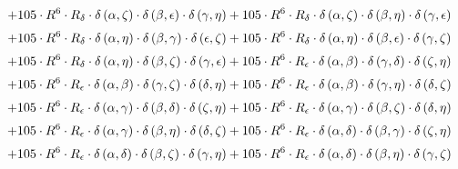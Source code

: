 \begin{subequations}
\begin{gather}
 \\[0.2em] \notag 		 + 105 \cdot R^{6} \cdot R_{\delta{}} \cdot \delta{}\left(\alpha{}, \zeta{}\right) \cdot \delta{}\left(\beta{}, \epsilon{}\right) \cdot \delta{}\left(\gamma{}, \eta{}\right)+ 105 \cdot R^{6} \cdot R_{\delta{}} \cdot \delta{}\left(\alpha{}, \zeta{}\right) \cdot \delta{}\left(\beta{}, \eta{}\right) \cdot \delta{}\left(\gamma{}, \epsilon{}\right) 
 \\[0.2em] \notag 		 + 105 \cdot R^{6} \cdot R_{\delta{}} \cdot \delta{}\left(\alpha{}, \eta{}\right) \cdot \delta{}\left(\beta{}, \gamma{}\right) \cdot \delta{}\left(\epsilon{}, \zeta{}\right)+ 105 \cdot R^{6} \cdot R_{\delta{}} \cdot \delta{}\left(\alpha{}, \eta{}\right) \cdot \delta{}\left(\beta{}, \epsilon{}\right) \cdot \delta{}\left(\gamma{}, \zeta{}\right) 
 \\[0.2em] \notag 		 + 105 \cdot R^{6} \cdot R_{\delta{}} \cdot \delta{}\left(\alpha{}, \eta{}\right) \cdot \delta{}\left(\beta{}, \zeta{}\right) \cdot \delta{}\left(\gamma{}, \epsilon{}\right)+ 105 \cdot R^{6} \cdot R_{\epsilon{}} \cdot \delta{}\left(\alpha{}, \beta{}\right) \cdot \delta{}\left(\gamma{}, \delta{}\right) \cdot \delta{}\left(\zeta{}, \eta{}\right) 
 \\[0.2em] \notag 		 + 105 \cdot R^{6} \cdot R_{\epsilon{}} \cdot \delta{}\left(\alpha{}, \beta{}\right) \cdot \delta{}\left(\gamma{}, \zeta{}\right) \cdot \delta{}\left(\delta{}, \eta{}\right)+ 105 \cdot R^{6} \cdot R_{\epsilon{}} \cdot \delta{}\left(\alpha{}, \beta{}\right) \cdot \delta{}\left(\gamma{}, \eta{}\right) \cdot \delta{}\left(\delta{}, \zeta{}\right) 
 \\[0.2em] \notag 		 + 105 \cdot R^{6} \cdot R_{\epsilon{}} \cdot \delta{}\left(\alpha{}, \gamma{}\right) \cdot \delta{}\left(\beta{}, \delta{}\right) \cdot \delta{}\left(\zeta{}, \eta{}\right)+ 105 \cdot R^{6} \cdot R_{\epsilon{}} \cdot \delta{}\left(\alpha{}, \gamma{}\right) \cdot \delta{}\left(\beta{}, \zeta{}\right) \cdot \delta{}\left(\delta{}, \eta{}\right) 
 \\[0.2em] \notag 		 + 105 \cdot R^{6} \cdot R_{\epsilon{}} \cdot \delta{}\left(\alpha{}, \gamma{}\right) \cdot \delta{}\left(\beta{}, \eta{}\right) \cdot \delta{}\left(\delta{}, \zeta{}\right)+ 105 \cdot R^{6} \cdot R_{\epsilon{}} \cdot \delta{}\left(\alpha{}, \delta{}\right) \cdot \delta{}\left(\beta{}, \gamma{}\right) \cdot \delta{}\left(\zeta{}, \eta{}\right) 
 \\[0.2em] \notag 		 + 105 \cdot R^{6} \cdot R_{\epsilon{}} \cdot \delta{}\left(\alpha{}, \delta{}\right) \cdot \delta{}\left(\beta{}, \zeta{}\right) \cdot \delta{}\left(\gamma{}, \eta{}\right)+ 105 \cdot R^{6} \cdot R_{\epsilon{}} \cdot \delta{}\left(\alpha{}, \delta{}\right) \cdot \delta{}\left(\beta{}, \eta{}\right) \cdot \delta{}\left(\gamma{}, \zeta{}\right) 

\end{gather}
\end{subequations}
